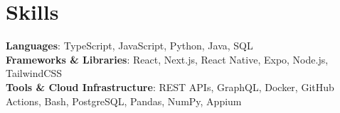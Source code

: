 \section{Skills}
    \begin{itemize}[leftmargin=0.15in, label={}]
	\small{\item{
		\textbf{Languages}{: TypeScript, JavaScript, Python, Java, SQL} \\
		\textbf{Frameworks \& Libraries}{: React, Next.js, React Native, Expo, Node.js, TailwindCSS} \\
		\textbf{Tools \& Cloud Infrastructure}{: REST APIs, GraphQL, Docker, GitHub Actions, Bash, PostgreSQL, Pandas, NumPy, Appium} \\
	}}
    \end{itemize}